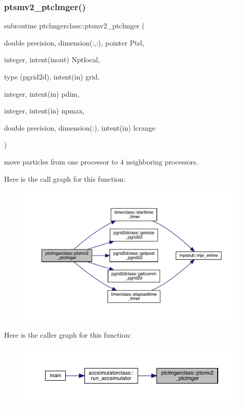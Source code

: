 \subsubsection{\texorpdfstring{ptsmv2\_ptclmger()}{ptsmv2\_ptclmger()}}
{\footnotesize\ttfamily subroutine ptclmgerclass\+::ptsmv2\+\_\+ptclmger (\begin{DoxyParamCaption}\item[{double precision, dimension(\+:,\+:), pointer}]{Ptsl,  }\item[{integer, intent(inout)}]{Nptlocal,  }\item[{type (pgrid2d), intent(in)}]{grid,  }\item[{integer, intent(in)}]{pdim,  }\item[{integer, intent(in)}]{npmax,  }\item[{double precision, dimension(\+:), intent(in)}]{lcrange }\end{DoxyParamCaption})}



move particles from one processor to 4 neighboring processors. 

Here is the call graph for this function\+:\nopagebreak
\begin{figure}[H]
\begin{center}
\leavevmode
\includegraphics[width=350pt]{namespaceptclmgerclass_a15bfd87febad22b6f820896f8720a3d7_cgraph}
\end{center}
\end{figure}
Here is the caller graph for this function\+:\nopagebreak
\begin{figure}[H]
\begin{center}
\leavevmode
\includegraphics[width=350pt]{namespaceptclmgerclass_a15bfd87febad22b6f820896f8720a3d7_icgraph}
\end{center}
\end{figure}
